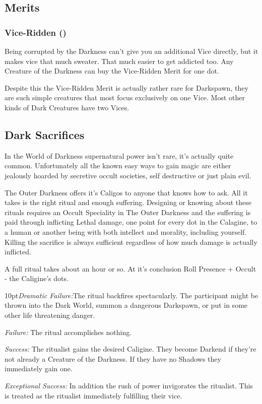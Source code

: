 \subsection*{Merits}

\subsubsection*{Vice-Ridden (\textbullet)}

Being corrupted by the Darkness can't give you an additional Vice directly, but it makes vice that much sweater. That much easier to get addicted too. Any Creature of the Darkness can buy the Vice-Ridden Merit for one dot. 

Despite this the Vice-Ridden Merit is actually rather rare for Darkspawn, they are such simple creatures that most focus exclusively on one Vice. Most other kinds of Dark Creatures have two Vices. 

\subsection*{Dark Sacrifices}

In the World of Darkness supernatural power isn't rare, it's actually quite common. Unfortunately all the known easy ways to gain magic are either jealously hoarded by secretive occult societies, self destructive or just plain evil.

The Outer Darkness offers it's Caligos to anyone that knows how to ask. All it takes is the right ritual and enough suffering. Designing or knowing about these rituals requires an Occult Speciality in The Outer Darkness and the suffering is paid through inflicting Lethal damage, one point for every dot in the Calagine, to a human or another being with both intellect and morality, including yourself. Killing the sacrifice is always sufficient regardless of how much damage is actually inflicted.

A full ritual takes about an hour or so. At it's conclusion Roll Presence + Occult - the Caligine's dots.

\begin{myindentpar}{10pt}\emph{Dramatic Failure:}The ritual backfires spectacularly. The participant might be thrown into the Dark World, summon a dangerous Darkspawn, or put in some other life threatening danger.
    
    \emph{Failure:} The ritual accomplishes nothing.
    
    \emph{Success:} The ritualist gains the desired Caligine. They become Darkend if they're not already a Creature of the Darkness. If they have no Shadows they immediately gain one.
    
    \emph{Exceptional Success:} In addition the rush of power invigorates the ritualist. This is treated as the ritualist immediately fulfilling their vice.\end{myindentpar}

